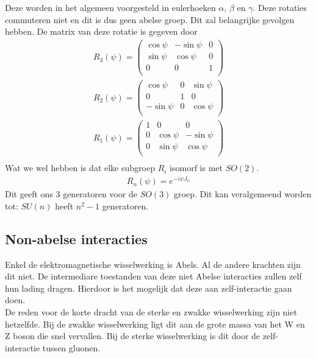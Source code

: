 \documentclass[../main.tex]{subfiles}
\begin{document}
Deze worden in het algemeen voorgesteld in eulerhoeken $\alpha$, $\beta$ en $\gamma$. Deze rotaties commuteren niet en dit is dus geen abelse groep. Dit zal belangrijke gevolgen hebben. De matrix van deze rotatie is gegeven door
\begin{equation}
    \begin{aligned}
        \label{eq:3d_rot}
        R_3(\psi) =
        \begin{pmatrix}
            \cos\psi & -\sin\psi & 0 \\
            \sin\psi & \cos\psi & 0 \\
            0 & 0 & 1 \\
        \end{pmatrix}\\
        R_2(\psi) =
        \begin{pmatrix}
            \cos\psi & 0 & \sin\psi \\
            0 & 1 & 0 \\
            -\sin\psi & 0 & \cos\psi \\
        \end{pmatrix}\\
        R_1(\psi) =
        \begin{pmatrix}
            1 & 0 & 0 \\
            0 & \cos\psi & -\sin\psi \\
            0 & \sin\psi & \cos\psi \\
        \end{pmatrix}\\
    \end{aligned}
\end{equation}
Wat we wel hebben is dat elke subgroep $R_i$ isomorf is met $SO(2)$.
\begin{equation}
    \begin{aligned}
        \label{eq:iso_so_2}
        R_n(\psi)=e^{-i\psi J_n}
    \end{aligned}
\end{equation}
Dit geeft ons 3 generatoren voor de $SO(3)$ groep. Dit kan veralgemeend worden tot: $SU(n)$ heeft $n^2-1$ generatoren.

\subsection{Non-abelse interacties}%
\label{sub:non_abelse_interacties}

Enkel de elektromagnetische wisselwerking is Abels. Al de andere krachten zijn dit niet. De intermediare toestanden van deze niet Abelse interacties zullen zelf hun lading dragen. Hierdoor is het mogelijk dat deze aan zelf-interactie gaan doen.\\
De reden voor de korte dracht van de sterke en zwakke wisselwerking zijn niet hetzelfde. Bij de zwakke wisselwerking ligt dit aan de grote massa van het W en Z boson die snel vervallen. Bij de sterke wisselwerking is dit door de zelf-interactie tussen gluonen.
\end{document}
